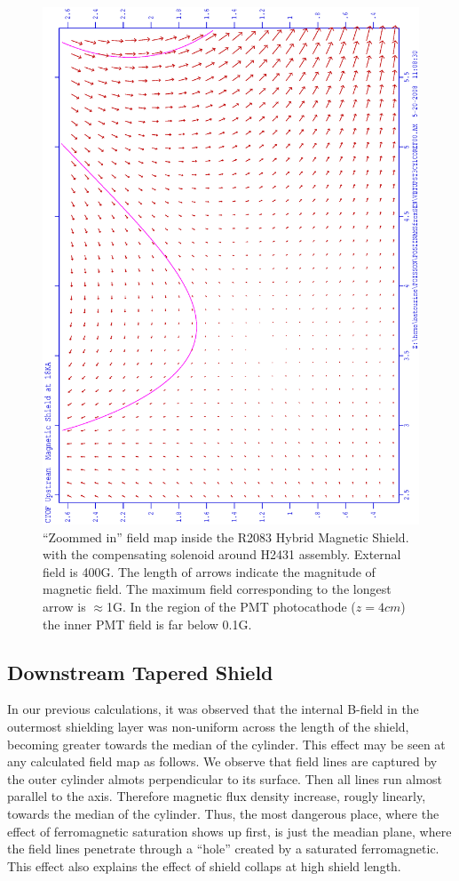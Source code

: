 \documentclass[12pt]{article}
\begin{document}
\begin{figure}[htbp]
\centering
\includegraphics[width=.6\textwidth]{VBTUPST3CY1COREF0002.eps}
\caption{\small{  ``Zoommed in'' field map inside the R2083 Hybrid Magnetic Shield.
with the compensating solenoid around H2431 assembly. External field is 400G.
The length of arrows indicate the magnitude of magnetic field. 
The maximum field corresponding to the longest arrow  is $\approx$1G.
In the region of the  PMT photocathode ($z=4cm$)  the inner PMT field
is far  below  0.1G.}}
\label{VBT3CYUS2}
\end{figure}




\subsection{Downstream Tapered  Shield}

In our previous calculations, it was observed that the 
internal B-field  in the outermost shielding layer was 
non-uniform across the length of the shield, becoming greater
towards the median of the cylinder.
This effect may be seen at any calculated field map as follows.
We observe that
field lines are captured  by the outer cylinder almots perpendicular
to its surface. Then all lines
run  almost parallel to the axis. Therefore  magnetic flux density 
increase, rougly linearly, 
towards the median of the cylinder. Thus, the  most dangerous place,
where the  effect of  ferromagnetic saturation 
shows up first, is just  the meadian plane, where the field lines penetrate
through a ``hole'' created by a saturated ferromagnetic. This effect also
explains the effect of shield collaps at high shield length. 
\end{document}

